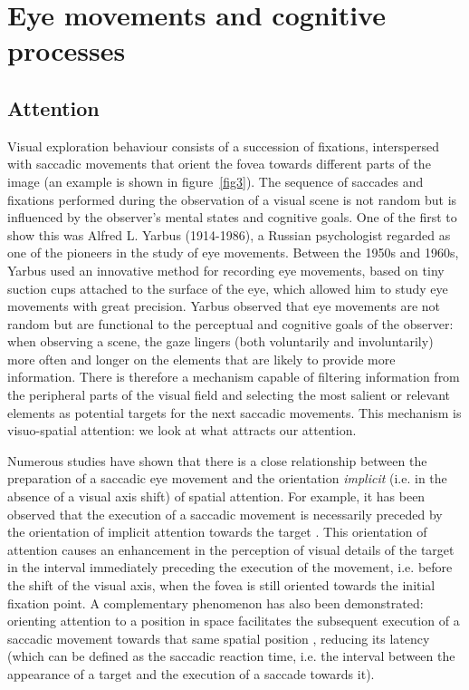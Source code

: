 \documentclass[11pt]{article}
\begin{document}
\break
\section{Eye movements and cognitive processes}

\subsection{Attention}
Visual exploration behaviour consists of a succession of fixations, interspersed with saccadic movements that orient the fovea towards different parts of the image (an example is shown in figure~\ref{fig3}). The sequence of saccades and fixations performed during the observation of a visual scene is not random but is influenced by the observer's mental states and cognitive goals. One of the first to show this was Alfred L. Yarbus (1914-1986), a Russian psychologist regarded as one of the pioneers in the study of eye movements. Between the 1950s and 1960s, Yarbus used an innovative method for recording eye movements, based on tiny suction cups attached to the surface of the eye, which allowed him to study eye movements with great precision. Yarbus observed that eye movements are not random but are functional to the perceptual and cognitive goals of the observer: when observing a scene, the gaze lingers (both voluntarily and involuntarily) more often and longer on the elements that are likely to provide more information. There is therefore a mechanism capable of filtering information from the peripheral parts of the visual field and selecting the most salient or relevant elements as potential targets for the next saccadic movements. This mechanism is visuo-spatial attention: we look at what attracts our attention.

Numerous studies have shown that there is a close relationship between the preparation of a saccadic eye movement and the orientation \textit{implicit} (i.e. in the absence of a visual axis shift) of spatial attention. For example, it has been observed that the execution of a saccadic movement is necessarily preceded by the orientation of implicit attention towards the target \cite{Deubel1996}. This orientation of attention causes an enhancement in the perception of visual details of the target in the interval immediately preceding the execution of the movement, i.e. before the shift of the visual axis, when the fovea is still oriented towards the initial fixation point. A complementary phenomenon has also been demonstrated: orienting attention to a position in space facilitates the subsequent execution of a saccadic movement towards that same spatial position \cite{Kowler1995}, reducing its latency (which can be defined as the saccadic reaction time, i.e. the interval between the appearance of a target and the execution of a saccade towards it).
\end{document}
